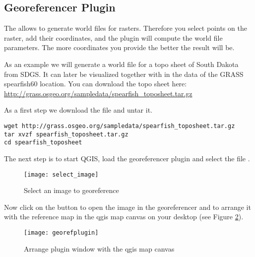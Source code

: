 
\subsection{Georeferencer Plugin}

\updatedisclaimer

The  allows to generate world files for rasters.
Therefore you select points on the raster, add their coordinates, and the plugin will compute the world file parameters.
The more coordinates you provide the better the result will be.

As an example we will generate a world file for a topo sheet of South Dakota from SDGS.
It can later be visualized together with in the data of the GRASS spearfish60 location.
You can download the topo sheet here: \url{http://grass.osgeo.org/sampledata/spearfish\_toposheet.tar.gz}

As a first step we download the file and untar it.

\begin{verbatim}
wget http://grass.osgeo.org/sampledata/spearfish_toposheet.tar.gz
tar xvzf spearfish_toposheet.tar.gz
cd spearfish_toposheet
\end{verbatim}

The next step is to start QGIS, load the georeferencer plugin and select the file .

\begin{figure}[ht]
\begin{center}
\caption{Select an image to georeference \nixcaption}\label{fig:select_image}\smallskip
  \texttt{[image: select\_image]}
\end{center}
\end{figure}

Now click on the button  to open the image in
the georeferencer and to arrange it with the reference map in the qgis map
canvas on your desktop (see Figure \ref{fig:georefplugin}).

\begin{figure}[ht]
\begin{center}
  \caption{Arrange plugin window with the qgis map canvas \nixcaption}\label{fig:georefplugin}\smallskip
  \texttt{[image: georefplugin]}
\end{center}
\end{figure}

